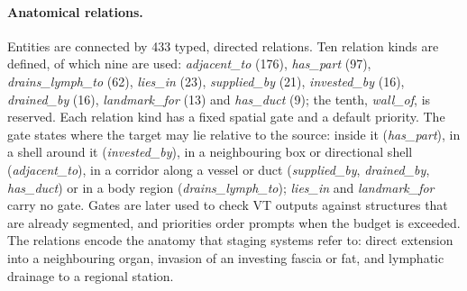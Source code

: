 \documentclass[fleqn,10pt]{olplainarticle}
\begin{document}
\paragraph{Anatomical relations.}
Entities are connected by 433 typed, directed relations. Ten relation kinds are defined, of which nine are used:
\emph{adjacent\_to} (176), \emph{has\_part} (97), \emph{drains\_lymph\_to} (62), \emph{lies\_in} (23),
\emph{supplied\_by} (21), \emph{invested\_by} (16), \emph{drained\_by} (16), \emph{landmark\_for} (13) and
\emph{has\_duct} (9); the tenth, \emph{wall\_of}, is reserved. Each relation kind has a fixed spatial gate and a default
priority. The gate states where the target may lie relative to the source: inside it (\emph{has\_part}), in a shell
around it (\emph{invested\_by}), in a neighbouring box or directional shell (\emph{adjacent\_to}), in a corridor along
a vessel or duct (\emph{supplied\_by}, \emph{drained\_by}, \emph{has\_duct}) or in a body region
(\emph{drains\_lymph\_to}); \emph{lies\_in} and \emph{landmark\_for} carry no gate. Gates are later used to check VT
outputs against structures that are already segmented, and priorities order prompts when the budget is exceeded. The relations encode the anatomy that staging systems refer to: direct extension
into a neighbouring organ, invasion of an investing fascia or fat, and lymphatic drainage to a regional station.
\end{document}
